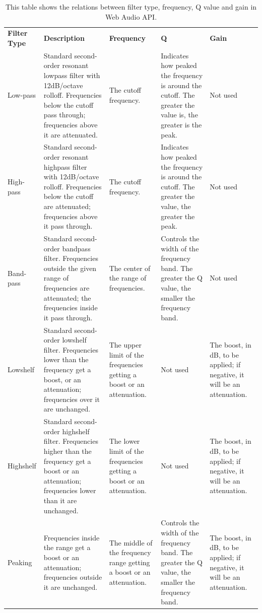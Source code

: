\documentclass{l4proj}
\begin{document}
\begin{appendices}
\begin{landscape}
\begin{table}[htbp]
    \caption{This table shows the relations between filter type, frequency, Q value and gain in Web Audio API.}\label{tab:filters}
    \begin{tabular}{p{3cm}p{6cm}p{4cm}p{4cm}p{4cm}}
    \textbf{Filter Type} & \textbf{Description} & \textbf{Frequency} & \textbf{Q} & \textbf{Gain} \\ 
    Low-pass & Standard second-order resonant lowpass filter with 12dB/octave rolloff. Frequencies below the cutoff pass through; frequencies above it are attenuated. & The cutoff frequency. & Indicates how peaked the frequency is around the cutoff. The greater the value is, the greater is the peak. & Not used \\ 
    High-pass & Standard second-order resonant highpass filter with 12dB/octave rolloff. Frequencies below the cutoff are attenuated; frequencies above it pass through. & The cutoff frequency. & Indicates how peaked the frequency is around the cutoff. The greater the value, the greater the peak. & Not used \\ 
    Band-pass & Standard second-order bandpass filter. Frequencies outside the given range of frequencies are attenuated; the frequencies inside it pass through. & The center of the range of frequencies. & Controls the width of the frequency band. The greater the Q value, the smaller the frequency band. & Not used \\ 
    Lowshelf & Standard second-order lowshelf filter. Frequencies lower than the frequency get a boost, or an attenuation; frequencies over it are unchanged. & The upper limit of the frequencies getting a boost or an attenuation. & Not used & The boost, in dB, to be applied; if negative, it will be an attenuation. \\ 
    Highshelf & Standard second-order highshelf filter. Frequencies higher than the frequency get a boost or an attenuation; frequencies lower than it are unchanged. & The lower limit of the frequencies getting a boost or an attenuation. & Not used & The boost, in dB, to be applied; if negative, it will be an attenuation. \\ 
    Peaking & Frequencies inside the range get a boost or an attenuation; frequencies outside it are unchanged. & The middle of the frequency range getting a boost or an attenuation. & Controls the width of the frequency band. The greater the Q value, the smaller the frequency band. & The boost, in dB, to be applied; if negative, it will be an attenuation. \\ 

\end{tabular}
\end{table}
\end{landscape}
\end{appendices}
\end{document}
